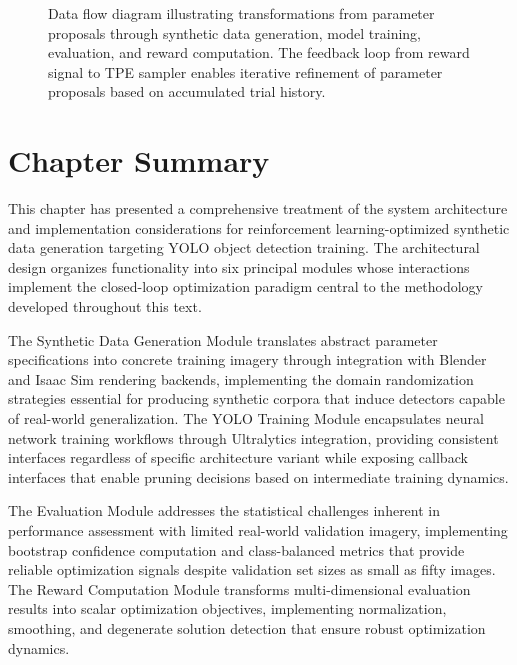 \begin{figure}[htbp]
\caption{Data flow diagram illustrating transformations from parameter proposals through synthetic data generation, model training, evaluation, and reward computation. The feedback loop from reward signal to TPE sampler enables iterative refinement of parameter proposals based on accumulated trial history.}
\label{fig:data_flow}
\end{figure}

\section{Chapter Summary}

This chapter has presented a comprehensive treatment of the system architecture and implementation considerations for reinforcement learning-optimized synthetic data generation targeting YOLO object detection training. The architectural design organizes functionality into six principal modules whose interactions implement the closed-loop optimization paradigm central to the methodology developed throughout this text.

The Synthetic Data Generation Module translates abstract parameter specifications into concrete training imagery through integration with Blender and Isaac Sim rendering backends, implementing the domain randomization strategies essential for producing synthetic corpora that induce detectors capable of real-world generalization. The YOLO Training Module encapsulates neural network training workflows through Ultralytics integration, providing consistent interfaces regardless of specific architecture variant while exposing callback interfaces that enable pruning decisions based on intermediate training dynamics.

The Evaluation Module addresses the statistical challenges inherent in performance assessment with limited real-world validation imagery, implementing bootstrap confidence computation and class-balanced metrics that provide reliable optimization signals despite validation set sizes as small as fifty images. The Reward Computation Module transforms multi-dimensional evaluation results into scalar optimization objectives, implementing normalization, smoothing, and degenerate solution detection that ensure robust optimization dynamics.

